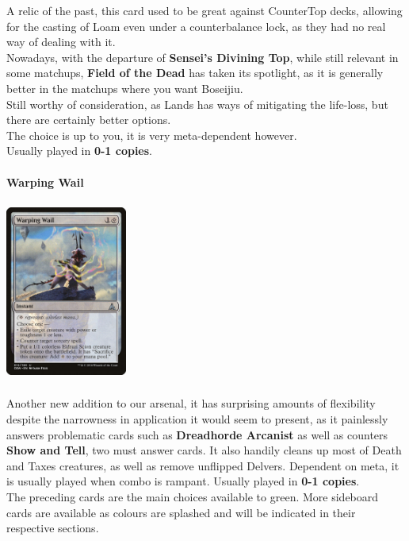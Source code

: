 \documentclass{report}
\begin{document}
A relic of the past, this card used to be great against CounterTop decks, allowing for the casting of Loam even under a counterbalance lock, as they had no real way of dealing with it.\\ Nowadays, with the departure of \textbf{Sensei's Divining Top}, while still relevant in some matchups, \textbf{Field of the Dead} has taken its spotlight, as it is generally better in the matchups where you want Boseijiu.\\Still worthy of consideration, as Lands has ways of mitigating the life-loss, but there are certainly better options.\\The choice is up to you, it is very meta-dependent however.\\Usually played in \textbf{0-1 copies}.\\\\
\textbf{Warping Wail\\}
\begin{center}
\includegraphics [width = 4cm, height = 6cm] {warping-wail}
\end{center}
Another new addition to our arsenal, it has surprising amounts of flexibility despite the narrowness in application it would seem to present, as it painlessly answers problematic cards such as \textbf{Dreadhorde Arcanist} as well as counters \textbf{Show and Tell}, two must answer cards. It also handily cleans up most of Death and Taxes creatures, as well as remove unflipped Delvers. Dependent on meta, it is usually played when combo is rampant.
Usually played in \textbf{0-1 copies}.\\
The preceding cards are the main choices available to green. More sideboard cards are available as colours are splashed and will be indicated in their respective sections.
\end{document}
